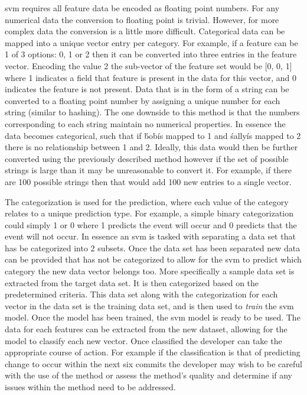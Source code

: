 \gls{svm} requires all feature data be encoded as floating point numbers. For any numerical data the conversion to floating point is trivial. However, for more complex data the conversion is a little more difficult. Categorical data can be mapped into a unique vector entry per category. For example, if a feature can be 1 of 3 options: 0, 1 or 2 then it can be converted into three entries in the feature vector. Encoding the value 2 the sub-vector of the feature set would be [0, 0, 1] where 1 indicates a field that feature is present in the data for this vector, and 0 indicates the feature is not present. Data that is in the form of a string can be converted to a floating point number by assigning a unique number for each string (similar to hashing). The one downside to this method is that the numbers corresponding to each string maintain no numerical properties. In essence the data becomes categorical, such that if \'bob\' is mapped to 1 and \'sally\' is mapped to 2 there is no relationship between 1 and 2. Ideally, this data would then be further converted using the previously described method however if the set of possible strings is large than it may be unreasonable to convert it. For example, if there are 100 possible strings then that would add 100 new entries to a single vector.


The categorization is used for the prediction, where each value of the category relates to a unique prediction type. For example, a simple binary categorization could simply 1 or 0 where 1 predicts the event will occur and 0 predicts that the event will not occur. In essence an \gls{svm} is tasked with separating a data set that has be categorized into 2 subsets. Once the data set has been separated new data can be provided that has not be categorized to allow for the \gls{svm} to predict which category the new data vector belongs too. More specifically a sample data set is extracted from the target data set. It is then categorized based on the predetermined criteria. This data set along with the categorization for each vector in the data set is the training data set, and is then used to \textit{train} the \gls{svm} model. Once the model has been trained, the \gls{svm} model is ready to be used. The data for each features can be extracted from the new dataset, allowing for the model to classify each new vector. Once classified the developer can take the appropriate course of action. For example if the classification is that of predicting change to occur within the next six commits the developer may wish to be careful with the use of the method or assess the method's quality and determine if any issues within the method need to be addressed.

